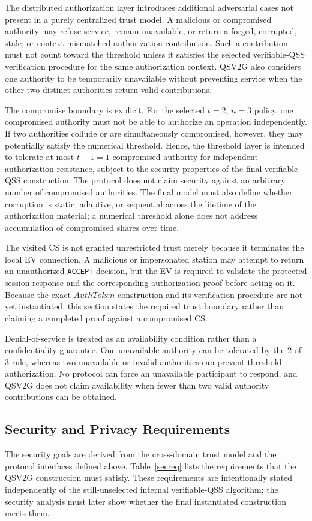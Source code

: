 \documentclass[twocolumn,10pt,journal]{IEEEtran}
\begin{document}
The distributed authorization layer introduces additional adversarial cases not present in a purely centralized trust model. A malicious or compromised authority may refuse service, remain unavailable, or return a forged, corrupted, stale, or context-mismatched authorization contribution. Such a contribution must not count toward the threshold unless it satisfies the selected verifiable-QSS verification procedure for the same authorization context. QSV2G also considers one authority to be temporarily unavailable without preventing service when the other two distinct authorities return valid contributions.

The compromise boundary is explicit. For the selected $t=2$, $n=3$ policy, one compromised authority must not be able to authorize an operation independently. If two authorities collude or are simultaneously compromised, however, they may potentially satisfy the numerical threshold. Hence, the threshold layer is intended to tolerate at most $t-1=1$ compromised authority for independent-authorization resistance, subject to the security properties of the final verifiable-QSS construction. The protocol does not claim security against an arbitrary number of compromised authorities. The final model must also define whether corruption is static, adaptive, or sequential across the lifetime of the authorization material; a numerical threshold alone does not address accumulation of compromised shares over time.

The visited CS is not granted unrestricted trust merely because it terminates the local EV connection. A malicious or impersonated station may attempt to return an unauthorized \texttt{ACCEPT} decision, but the EV is required to validate the protected session response and the corresponding authorization proof before acting on it. Because the exact $AuthToken$ construction and its verification procedure are not yet instantiated, this section states the required trust boundary rather than claiming a completed proof against a compromised CS.

Denial-of-service is treated as an availability condition rather than a confidentiality guarantee. One unavailable authority can be tolerated by the $2$-of-$3$ rule, whereas two unavailable or invalid authorities can prevent threshold authorization. No protocol can force an unavailable participant to respond, and QSV2G does not claim availability when fewer than two valid authority contributions can be obtained.

\subsection{Security and Privacy Requirements}
The security goals are derived from the cross-domain trust model and the protocol interfaces defined above. Table~\ref{secreq} lists the requirements that the QSV2G construction must satisfy. These requirements are intentionally stated independently of the still-unselected internal verifiable-QSS algorithm; the security analysis must later show whether the final instantiated construction meets them.
\end{document}
